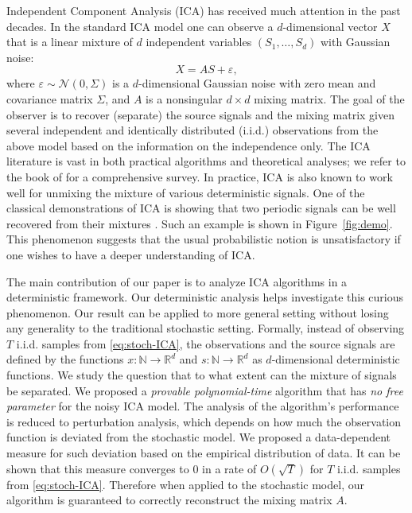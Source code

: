 \documentclass{article} %
\newcommand{\iid}{i.i.d.\xspace}
\newcommand{\ra}{\rightarrow}
\newcommand{\real}{\mathbb{R}}
\renewcommand{\natural}{\mathbb{N}}
\renewcommand{\epsilon}{\varepsilon}
\theoremstyle{definition}
\begin{document}
Independent Component Analysis (ICA)
has received much attention in the past decades. 
In the standard ICA model one can observe a $d$-dimensional vector $X$ that is a linear mixture of $d$ independent variables $(S_1,\ldots, S_d)$ with Gaussian noise:
\begin{equation}
\label{eq:stoch-ICA}
X = AS+\epsilon,
\end{equation}
where $\epsilon \sim \mathcal{N}(0,\Sigma)$ is a $d$-dimensional Gaussian noise with zero mean and covariance matrix $\Sigma$, and $A$ is a nonsingular $d \times d$ mixing matrix. 
The goal of the observer is to recover (separate) the source signals and the mixing matrix given several independent and identically distributed (\iid) observations from the above model based on the information on the independence only.
The ICA literature is vast in both practical algorithms and theoretical analyses; 
we refer to the book of \citet{comon2010handbook} for a comprehensive survey.
In practice, ICA is also known to work well for unmixing the mixture of various deterministic signals. 
One of the classical demonstrations of ICA is showing that two periodic signals can be well recovered from their mixtures \citep{HyvOja00}.
Such an example is shown in Figure~\ref{fig:demo}. 
This phenomenon suggests that the usual probabilistic notion is unsatisfactory if one wishes to have a deeper understanding of ICA.  

The main contribution of our paper is to analyze ICA algorithms in a deterministic framework. 
Our deterministic analysis helps investigate this curious phenomenon. Our result can be applied to more general setting without losing any generality to the traditional stochastic setting. 
Formally, instead of observing $T$ \iid samples from \eqref{eq:stoch-ICA}, the observations and the source signals are defined by the functions  $x:\natural \ra \real^d$ and $s:\natural \ra \real^d$ as $d$-dimensional deterministic functions. 
We study the question that to what extent can the mixture of signals be separated. 
We proposed a \emph{provable polynomial-time} algorithm that has \emph{no free parameter} for the noisy ICA model.
The analysis of the algorithm's performance is reduced to perturbation analysis, which depends on how much the observation function is deviated from the stochastic model. 
We proposed a data-dependent measure for such deviation based on the empirical distribution of data.
It can be shown that this measure converges to 0 in a rate of $O(\sqrt{T})$ for $T$ \iid samples from  \eqref{eq:stoch-ICA}.
Therefore when applied to the stochastic model, our algorithm is guaranteed to correctly reconstruct the mixing matrix $A$.
\end{document}

